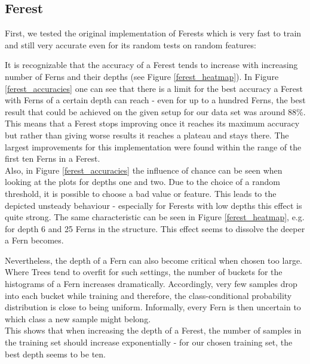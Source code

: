\documentclass[twocolumn]{article}
\begin{document}
\subsection{Ferest}

First, we tested the original implementation of Ferests which is very fast to train and still very accurate even for its random tests on random features:

It is recognizable that the accuracy of a Ferest tends to increase with increasing number of Ferns and their depths (see Figure \ref{ferest_heatmap}). In Figure \ref{ferest_accuracies} one can see that there is a limit for the best accuracy a Ferest with Ferns of a certain depth can reach - even for up to a hundred Ferns, the best result that could be achieved on the given setup for our data set was around 88\%. This means that a Ferest stops improving once it reaches its maximum accuracy but rather than giving worse results it reaches a plateau and stays there. The largest improvements for this implementation were found within the range of the first ten Ferns in a Ferest.\\
Also, in Figure \ref{ferest_accuracies} the influence of chance can be seen when looking at the plots for depths one and two. Due to the choice of a random threshold, it is possible to choose a bad value or feature. This leads to the depicted unsteady behaviour - especially for Ferests with low depths this effect is quite strong. The same characteristic can be seen in Figure \ref{ferest_heatmap}, e.g. for depth 6 and 25 Ferns in the structure. This effect seems to dissolve the deeper a Fern becomes.

Nevertheless, the depth of a Fern can also become critical when chosen too large. Where Trees tend to overfit for such settings, the number of buckets for the histograms of a Fern increases dramatically. Accordingly, very few samples drop into each bucket while training and therefore, the class-conditional probability distribution is close to being uniform. Informally, every Fern is then uncertain to which class a new sample might belong.\\
This shows that when increasing the depth of a Ferest, the number of samples in the training set should increase exponentially - for our chosen training set, the best depth seems to be ten.
\end{document}

